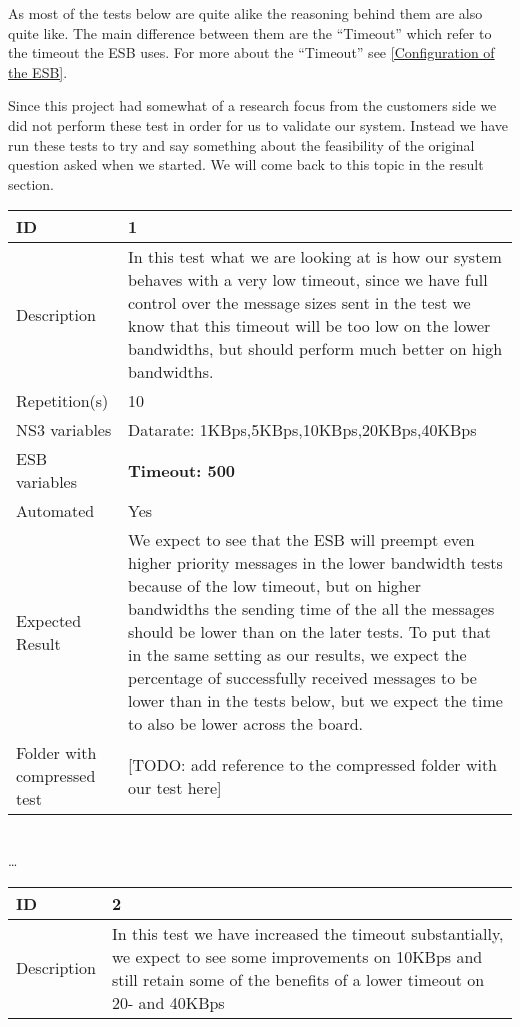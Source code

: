 	As most of the tests below are quite alike the reasoning behind them are also quite like. The main difference between them are the “Timeout” which refer to the timeout the ESB uses. For more about the “Timeout” see \ref{Configuration of the ESB}.

	Since this project had somewhat of a research focus from the customers side we did not perform these test in order for us to validate our system. Instead we have run these tests to try and say something about the feasibility of the original question asked when we started. We will come back to this topic in the result section.
\begin{center}
\begin{tabular}{| p{4cm} | p{8cm} |}%
\hline
ID & 1 \\
\hline
Description &  In this test what we are looking at is how our system behaves with a very low timeout, since we have full control over the message sizes sent in the test we know that this timeout will be too low on the lower bandwidths, but should perform much better on high bandwidths. \\
\hline
Repetition(s) & 10 \\
\hline
NS3 variables & Datarate: 1KBps,5KBps,10KBps,20KBps,40KBps \\
\hline
ESB variables & \textbf{Timeout: 500} \\
\hline
Automated & Yes \\
\hline
Expected Result & We expect to see that the ESB will preempt even higher priority messages in the lower bandwidth tests because of the low timeout, but on higher bandwidths the sending time of the all the messages should be lower than on the later tests. To put that in the same setting as our results, we expect the percentage of successfully received messages to be lower than in the tests below, but we expect the time to also be lower across the board.  \\
\hline
Folder with compressed test & [TODO: add reference to the compressed folder with our test here]\\
\hline
\end{tabular}
\\ \ldots \\
\begin{tabular}{| p{4cm} | p{8cm} |}%
\hline
ID & 2 \\
\hline
Description & In this test we have increased the timeout substantially, we expect to see some improvements on 10KBps and still retain some of the benefits of a lower timeout on 20- and 40KBps \\

\end{tabular}
\end{center}
